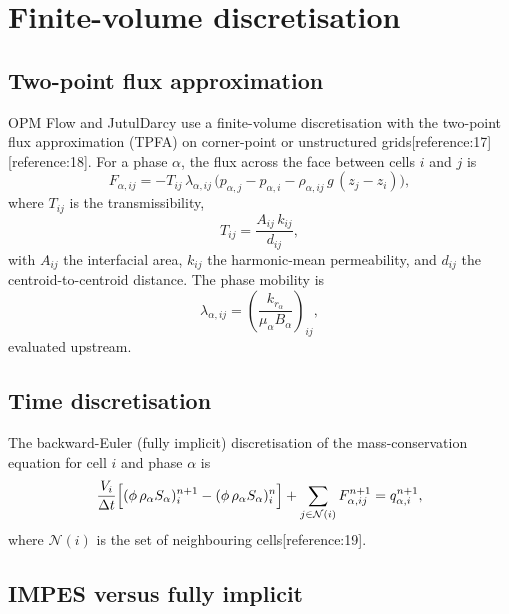 \documentclass[10pt,a4paper]{article}
\newcommand{\kr}{k_r}
\begin{document}
\section{Finite-volume discretisation}

\subsection{Two-point flux approximation}

OPM Flow and JutulDarcy use a finite-volume discretisation with the two-point
flux approximation (TPFA) on corner-point or unstructured grids[reference:17]
[reference:18]. For a phase $\alpha$, the flux across the face between cells
$i$ and $j$ is
\begin{equation}
  F_{\alpha,ij} = -T_{ij}\,\lambda_{\alpha,ij}\,
  \bigl(p_{\alpha,j}-p_{\alpha,i} - \rho_{\alpha,ij}\,g\,(z_j-z_i)\bigr),
  \label{eq:tpfa}
\end{equation}
where $T_{ij}$ is the transmissibility,
\begin{equation}
  T_{ij} = \frac{A_{ij}\,k_{ij}}{d_{ij}},
  \label{eq:trans}
\end{equation}
with $A_{ij}$ the interfacial area, $k_{ij}$ the harmonic-mean permeability,
and $d_{ij}$ the centroid-to-centroid distance. The phase mobility is
\begin{equation}
  \lambda_{\alpha,ij} = \left(\frac{\kr_\alpha}{\mu_\alpha B_\alpha}\right)_{\!ij},
  \label{eq:mobility}
\end{equation}
evaluated upstream.

\subsection{Time discretisation}

The backward-Euler (fully implicit) discretisation of the mass-conservation
equation for cell $i$ and phase $\alpha$ is
\begin{equation}
  \frac{V_i}{\Delta t}
  \Bigl[(\phi\,\rho_\alpha S_\alpha)_i^{n+1}
       -(\phi\,\rho_\alpha S_\alpha)_i^{n}\Bigr]
  + \sum_{j\in\mathcal{N}(i)} F_{\alpha,ij}^{n+1}
  = q_{\alpha,i}^{n+1},
  \label{eq:be}
\end{equation}
where $\mathcal{N}(i)$ is the set of neighbouring cells[reference:19].

\subsection{IMPES versus fully implicit}
\end{document}
